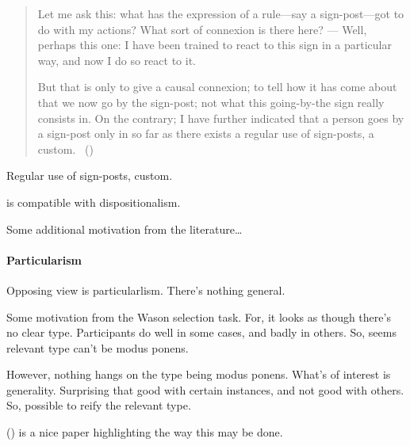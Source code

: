 \begin{note}
  \begin{quote}
    Let me ask this: what has the expression of a rule—say a sign-post—got to do with my actions?
    What sort of connexion is there here?%
    ---%
    Well, perhaps this one:
    I have been trained to react to this sign in a particular way, and now I do so react to it.

    But that is only to give a causal connexion; to tell how it has come about that we now go by the sign-post; not what this going-by-the sign really consists in.
    On the contrary; I have further indicated that a person goes by a sign-post only in so far as there exists a regular use of sign-posts, a custom.%
    \mbox{ }\hfill\mbox{(\citeyear[\S198]{Wittgenstein:1958aa})}
  \end{quote}

  Regular use of sign-posts, custom.
\end{note}

\begin{note}
  \sR{} is compatible with dispositionalism.

\end{note}

\begin{note}
  Some additional motivation from the literature\dots
\end{note}

\paragraph{Particularism}

\begin{note}
  Opposing view is particularlism.
  There's nothing general.

  Some motivation from the Wason selection task.
  For, it looks as though there's no clear type.
  Participants do well in some cases, and badly in others.
  So, seems relevant type can't be modus ponens.

  However, nothing hangs on the type being modus ponens.
  What's of interest is generality.
  Surprising that good with certain instances, and not good with others.
  So, possible to reify the relevant type.

  (\cite{Fodor:2000aa}) is a nice paper highlighting the way this may be done.
\end{note}

